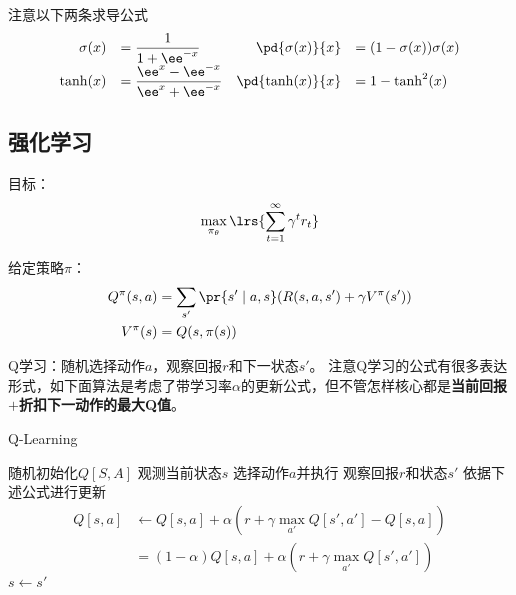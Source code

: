 注意以下两条求导公式
\[\begin{array}{rlrl}
\sigma(x)&=\dfrac{1}{1+\ee^{-x}} & \pd{\sigma(x)}{x}&=(1-\sigma(x))\sigma(x)\\
\tanh(x)&=\dfrac{\ee^x-\ee^{-x}}{\ee^x+\ee^{-x}} & \pd{\tanh(x)}{x}&=1-\tanh^2(x)
\end{array}\]

\subsection{强化学习}
目标：
\[\max_{\pi_\theta}\lrs{\sum_{t=1}^\infty\gamma^tr_t}\]

给定策略$\pi$：
\[\begin{aligned}
Q^\pi(s,a) &= \sum_{s'}\pr{s'\mid a,s}(R(s,a,s')+\gamma V^\pi(s'))\\
V^\pi(s) &= Q(s,\pi(s))
\end{aligned}\]

Q学习：随机选择动作$a$，观察回报$r$和下一状态$s'$。
注意Q学习的公式有很多表达形式，如下面算法是考虑了带学习率$\alpha$的更新公式，但不管怎样核心都是\textbf{当前回报$+$折扣下一动作的最大Q值}。
\begin{algorithm}[H]
\caption{Q-Learning}
\begin{algorithmic}[1]
\State 随机初始化$Q[S,A]$
\State 观测当前状态$s$
\Repeat
\State 选择动作$a$并执行
\State 观察回报$r$和状态$s'$
\State 依据下述公式进行更新
\[\begin{aligned}
Q[s,a]&\gets Q[s,a]+\alpha(r+\gamma\max_{a'}Q[s',a']-Q[s,a])\\
&=(1-\alpha)Q[s,a] +\alpha(r+\gamma\max_{a'}Q[s',a'])
\end{aligned}\]
\State $s\gets s'$
\end{algorithmic}
\end{algorithm}